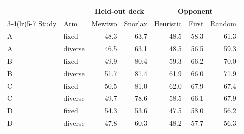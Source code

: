 \begin{tabular}{@{}llrrrrr@{}}
\toprule
 & & \multicolumn{2}{c}{Held-out deck} & \multicolumn{3}{c}{Opponent} \\
\cmidrule(lr){3-4}\cmidrule(lr){5-7}
Study & Arm & Mewtwo & Snorlax & Heuristic & First & Random \\
\midrule
A & fixed & 48.3 & 63.7 & 48.5 & 58.3 & 61.3 \\
A & diverse & 46.5 & 63.1 & 48.5 & 56.5 & 59.3 \\
B & fixed & 49.9 & 80.4 & 59.3 & 66.2 & 70.0 \\
B & diverse & 51.7 & 81.4 & 61.9 & 66.0 & 71.9 \\
C & fixed & 50.5 & 81.0 & 62.0 & 67.9 & 67.4 \\
C & diverse & 49.7 & 78.6 & 58.5 & 66.1 & 67.9 \\
D & fixed & 54.3 & 53.6 & 47.5 & 58.0 & 56.2 \\
D & diverse & 47.8 & 60.3 & 48.2 & 57.7 & 56.3 \\
\bottomrule
\end{tabular}
